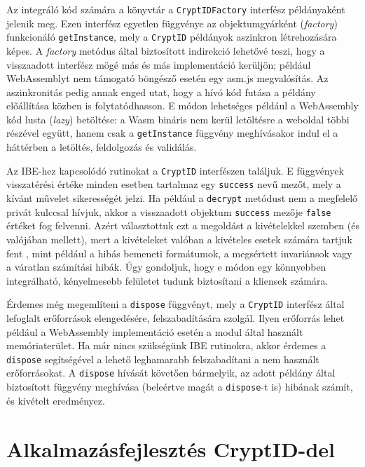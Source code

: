 

Az integráló kód számára a könyvtár a \texttt{CryptIDFactory} interfész példányaként jelenik meg. Ezen interfész egyetlen függvénye az objektumgyárként (\textit{factory}) funkcionáló \texttt{getInstance}, mely a \texttt{CryptID} példányok aszinkron létrehozására képes. A \textit{factory} metódus által biztosított indirekció lehetővé teszi, hogy a visszaadott interfész mögé más és más implementáció kerüljön; például WebAssemblyt nem támogató böngésző esetén egy asm.js megvalósítás. Az aszinkronitás pedig annak enged utat, hogy a hívó kód futása a példány előállítása közben is folytatódhasson. E módon lehetséges például a WebAssembly kód lusta (\textit{lazy}) betöltése: a Wasm bináris nem kerül letöltésre a weboldal többi részével együtt, hanem csak a \texttt{getInstance} függvény meghívásakor indul el a háttérben a letöltés, feldolgozás és validálás.

Az IBE-hez kapcsolódó rutinokat a \texttt{CryptID} interfészen találjuk. E függvények visszatérési értéke minden esetben tartalmaz egy \texttt{success} nevű mezőt, mely a kívánt művelet sikerességét jelzi. Ha például a \texttt{decrypt} metódust nem a megfelelő privát kulccsal hívjuk, akkor a visszaadott objektum \texttt{success} mezője \texttt{false} értéket fog felvenni. Azért választottuk ezt a megoldást a kivételekkel szemben (és valójában mellett), mert a kivételeket valóban a kivételes esetek számára tartjuk fent \cite{Bloch::EffectiveJava}, mint például a hibás bemeneti formátumok, a megsértett invariánsok vagy a váratlan számítási hibák. Úgy gondoljuk, hogy e módon egy könnyebben integrálható, kényelmesebb felületet tudunk biztosítani a kliensek számára.

Érdemes még megemlíteni a \texttt{dispose} függvényt, mely a \texttt{CryptID} interfész által lefoglalt erőforrások elengedésére, felszabadítására szolgál. Ilyen erőforrás lehet például a WebAssembly implementáció esetén a modul által használt memóriaterület. Ha már nincs szükségünk IBE rutinokra, akkor érdemes a \texttt{dispose} segítségével a lehető leghamarabb felszabadítani a nem használt erőforrásokat. A \texttt{dispose} hívását követően bármelyik, az adott példány által biztosított függvény meghívása (beleértve magát a \texttt{dispose}-t is) hibának számít, és kivételt eredményez. 

\section{Alkalmazásfejlesztés CryptID-del}
\label{Section::CryptID::ApplicationDevelopment}

